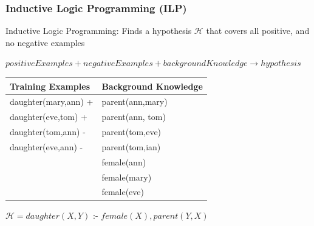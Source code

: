 \documentclass{beamer}
\begin{document}
\begin{frame}
\frametitle{Inductive Logic Programming (ILP)}
 Inductive Logic Programming: Finds a hypothesis $\mathcal{H}$ that covers all positive, and no negative examples
  \begin{fontsize}{10}{10}
    \begin{center}
    $positiveExamples + negativeExamples + background Knowledge \rightarrow hypothesis$
    \end{center}
    \begin{table}
      \begin{tabular}{ l  l }
      \toprule
      \textbf{Training Examples} & \textbf{Background Knowledge}\\
      \midrule
      daughter(mary,ann) +	& parent(ann,mary)	\\
      daughter(eve,tom)  +	& parent(ann, tom)	\\
      daughter(tom,ann)  - 	& parent(tom,eve)	\\
      daughter(eve,ann)  -	& parent(tom,ian) 	\\
				& female(ann)		\\
				& female(mary)		\\
				& female(eve)		\\
      \bottomrule
      \end{tabular}
    \end{table}
    \begin{center}
      $\mathcal{H} = daughter(X,Y)$ :- $female(X),parent(Y,X)$ 
    \end{center}
 \end{fontsize}
\end{frame}
\end{document}
